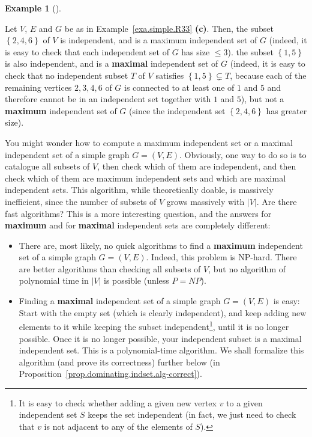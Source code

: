 \documentclass[numbers=enddot,12pt,final,onecolumn,notitlepage]{scrartcl}%
\theoremstyle{definition}
\newtheorem{exam}[theo]{Example}
\newenvironment{example}[1][]
{\begin{exam}[#1]\begin{leftbar}}
{\end{leftbar}\end{exam}}
\newcommand{\set}[1]{\left\{ #1 \right\}}
\newcommand{\abs}[1]{\left| #1 \right|}
\newcommand{\tup}[1]{\left( #1 \right)}
\begin{document}
\begin{example}
Let $V$, $E$ and $G$ be as in Example~\ref{exa.simple.R33}
\textbf{(c)}. Then, the subset $\set{2, 4, 6}$ of $V$ is
independent, and is a maximum independent set of $G$
(indeed, it is easy to check that each independent set of $G$
has size $\leq 3$). the subset $\set{1, 5}$ is also
independent, and is a \textbf{maximal} independent set of $G$
(indeed, it is easy to check that no independent subset $T$
of $V$ satisfies $\set{1, 5} \subsetneq T$, because each of
the remaining vertices $2, 3, 4, 6$ of $G$ is connected to
at least one of $1$ and $5$ and therefore cannot be in an
independent set together with $1$ and $5$), but not a
\textbf{maximum} independent set of $G$ (since the independent
set $\set{2, 4, 6}$ has greater size).
\end{example}

You might wonder how to compute a maximum independent set
or a maximal independent set of a simple graph $G = \tup{V, E}$.
Obviously, one way to do so is to catalogue all subsets of $V$,
then check which of them are independent, and then check which
of them are maximum independent sets and which are maximal
independent sets. This algorithm, while theoretically doable,
is massively inefficient, since the number of subsets of $V$
grows massively with $\abs{V}$. Are there fast algorithms?
This is a more interesting question, and the answers for
\textbf{maximum} and for \textbf{maximal} independent sets
are completely different:
\begin{itemize}
 \item There are, most likely, no quick algorithms to find
       a \textbf{maximum} independent set of a simple graph
       $G = \tup{V, E}$. Indeed, this problem is NP-hard. There
       are better algorithms than checking all subsets of $V$,
       but no algorithm of polynomial time in $\abs{V}$ is
       possible (unless $P = NP$).
 \item Finding a \textbf{maximal} independent set of a simple
       graph $G = \tup{V, E}$ is easy: Start with the empty
       set (which is clearly independent), and keep adding new
       elements to it while keeping the subset
       independent\footnote{It is easy to check whether
       adding a given new vertex
       $v$ to a given independent set $S$ keeps the set
       independent (in fact, we just need to check that $v$
       is not adjacent to any of the elements of $S$).},
       until it is no longer possible.
       Once it is no longer possible, your independent subset
       is a maximal independent set. This is a polynomial-time
       algorithm. We shall formalize this algorithm (and prove its
       correctness) further below (in
       Proposition~\ref{prop.dominating.indset.alg-correct}).
\end{itemize}
\end{document}

